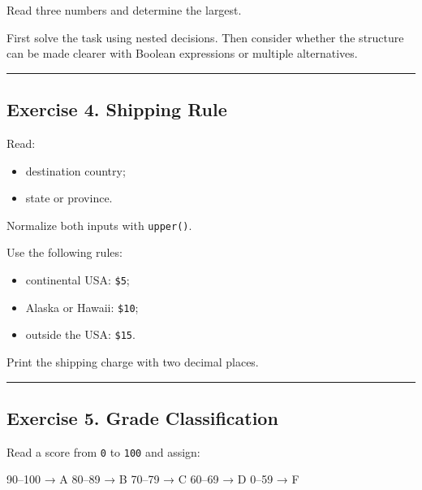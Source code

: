 \documentclass[
  11pt,
  a4paper,
]{article}
\newenvironment{Shaded}{}{}
\newcommand{\NormalTok}[1]{#1}
\providecommand{\tightlist}{%
  \setlength{\itemsep}{0pt}\setlength{\parskip}{0pt}}
\begin{document}
Read three numbers and determine the largest.

First solve the task using nested decisions. Then consider whether the
structure can be made clearer with Boolean expressions or multiple
alternatives.

\begin{center}\rule{0.5\linewidth}{0.5pt}\end{center}

\subsection{Exercise 4. Shipping Rule}\label{exercise-4.-shipping-rule}

Read:

\begin{itemize}
\tightlist
\item
  destination country;
\item
  state or province.
\end{itemize}

Normalize both inputs with \texttt{upper()}.

Use the following rules:

\begin{itemize}
\tightlist
\item
  continental USA: \texttt{\$5};
\item
  Alaska or Hawaii: \texttt{\$10};
\item
  outside the USA: \texttt{\$15}.
\end{itemize}

Print the shipping charge with two decimal places.

\begin{center}\rule{0.5\linewidth}{0.5pt}\end{center}

\subsection{Exercise 5. Grade
Classification}\label{exercise-5.-grade-classification}

Read a score from \texttt{0} to \texttt{100} and assign:

\begin{Shaded}
\begin{Highlighting}[]
\NormalTok{90–100 → A}
\NormalTok{80–89  → B}
\NormalTok{70–79  → C}
\NormalTok{60–69  → D}
\NormalTok{0–59   → F}
\end{Highlighting}
\end{Shaded}
\end{document}
